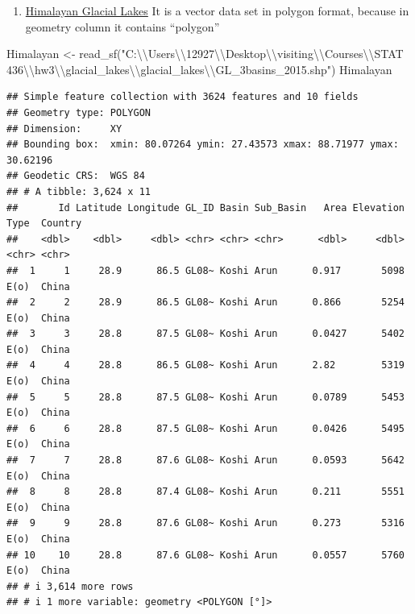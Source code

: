 \documentclass[
]{article}
\newenvironment{Shaded}{\begin{snugshade}}{\end{snugshade}}
\newcommand{\FunctionTok}[1]{\textcolor[rgb]{0.00,0.00,0.00}{#1}}
\newcommand{\NormalTok}[1]{#1}
\newcommand{\OtherTok}[1]{\textcolor[rgb]{0.56,0.35,0.01}{#1}}
\newcommand{\SpecialCharTok}[1]{\textcolor[rgb]{0.00,0.00,0.00}{#1}}
\newcommand{\StringTok}[1]{\textcolor[rgb]{0.31,0.60,0.02}{#1}}
\providecommand{\tightlist}{%
  \setlength{\itemsep}{0pt}\setlength{\parskip}{0pt}}
\begin{document}
\begin{enumerate}
\def\labelenumi{\alph{enumi}.}
\setcounter{enumi}{2}
\tightlist
\item
  \href{https://github.com/krisrs1128/stat479_s22/tree/main/_slides/week7/exercises/data/glacial_lakes}{Himalayan
  Glacial Lakes} It is a vector data set in polygon format, because in
  geometry column it contains ``polygon''
\end{enumerate}

\begin{Shaded}
\begin{Highlighting}[]
\NormalTok{Himalayan }\OtherTok{\textless{}{-}} \FunctionTok{read\_sf}\NormalTok{(}\StringTok{"C:}\SpecialCharTok{\textbackslash{}\textbackslash{}}\StringTok{Users}\SpecialCharTok{\textbackslash{}\textbackslash{}}\StringTok{12927}\SpecialCharTok{\textbackslash{}\textbackslash{}}\StringTok{Desktop}\SpecialCharTok{\textbackslash{}\textbackslash{}}\StringTok{visiting}\SpecialCharTok{\textbackslash{}\textbackslash{}}\StringTok{Courses}\SpecialCharTok{\textbackslash{}\textbackslash{}}\StringTok{STAT 436}\SpecialCharTok{\textbackslash{}\textbackslash{}}\StringTok{hw3}\SpecialCharTok{\textbackslash{}\textbackslash{}}\StringTok{glacial\_lakes}\SpecialCharTok{\textbackslash{}\textbackslash{}}\StringTok{glacial\_lakes}\SpecialCharTok{\textbackslash{}\textbackslash{}}\StringTok{GL\_3basins\_2015.shp"}\NormalTok{)}
\NormalTok{Himalayan}
\end{Highlighting}
\end{Shaded}

\begin{verbatim}
## Simple feature collection with 3624 features and 10 fields
## Geometry type: POLYGON
## Dimension:     XY
## Bounding box:  xmin: 80.07264 ymin: 27.43573 xmax: 88.71977 ymax: 30.62196
## Geodetic CRS:  WGS 84
## # A tibble: 3,624 x 11
##       Id Latitude Longitude GL_ID Basin Sub_Basin   Area Elevation Type  Country
##    <dbl>    <dbl>     <dbl> <chr> <chr> <chr>      <dbl>     <dbl> <chr> <chr>  
##  1     1     28.9      86.5 GL08~ Koshi Arun      0.917       5098 E(o)  China  
##  2     2     28.9      86.5 GL08~ Koshi Arun      0.866       5254 E(o)  China  
##  3     3     28.8      87.5 GL08~ Koshi Arun      0.0427      5402 E(o)  China  
##  4     4     28.8      86.5 GL08~ Koshi Arun      2.82        5319 E(o)  China  
##  5     5     28.8      87.5 GL08~ Koshi Arun      0.0789      5453 E(o)  China  
##  6     6     28.8      87.5 GL08~ Koshi Arun      0.0426      5495 E(o)  China  
##  7     7     28.8      87.6 GL08~ Koshi Arun      0.0593      5642 E(o)  China  
##  8     8     28.8      87.4 GL08~ Koshi Arun      0.211       5551 E(o)  China  
##  9     9     28.8      87.6 GL08~ Koshi Arun      0.273       5316 E(o)  China  
## 10    10     28.8      87.6 GL08~ Koshi Arun      0.0557      5760 E(o)  China  
## # i 3,614 more rows
## # i 1 more variable: geometry <POLYGON [°]>
\end{verbatim}
\end{document}
